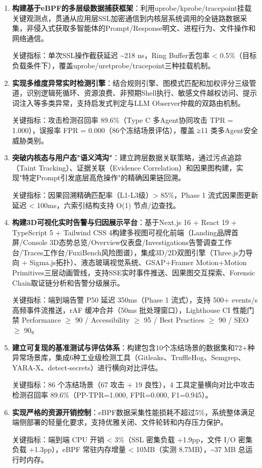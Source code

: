 \documentclass[a4paper]{ctexart}
\makeatletter
\renewcommand{\_}{%
  \ifmmode
    \nfss@text{\textunderscore}%
  \else
    \textunderscore\discretionary{}{}{}%
  \fi}
\makeatother
\begin{document}
\begin{enumerate}
\item \textbf{构建基于eBPF的多层级数据捕获框架}：利用uprobe/kprobe/tracepoint挂载关键观测点，贯通从应用层SSL加密通信到内核层系统调用的全链路数据采集，非侵入式获取多智能体的Prompt/Response明文、进程行为、文件操作和网络通信。

关键指标：单次SSL操作截获延迟 \textasciitilde{}218 ns，Ring Buffer丢包率 < 0.5\%（目标负载条件下），覆盖uprobe/uretprobe/tracepoint三种挂载机制。

\item \textbf{实现多维度异常实时检测引擎}：结合规则引擎、图模式匹配和加权评分三级管道，识别逻辑死循环、资源浪费、非预期Shell执行、敏感文件越权访问、提示词注入等多类异常，支持启发式判定与LLM Observer仲裁的双路由机制。

关键指标：攻击检测召回率 89.6\%（Type C 多Agent协同攻击 TPR = 1.000），误报率 FPR = 0.000（86个冻结场景评估），覆盖 ≥11 类多Agent安全威胁类别。

\item \textbf{突破内核态与用户态"语义鸿沟"}：建立跨层数据关联策略，通过污点追踪（Taint Tracking）、证据关联（Evidence Correlation）和因果图构建，实现"特定Prompt引发底层高危操作"的精确因果链回溯。

关键指标：因果回溯精确匹配率（L1-L3级）> 85\%，Phase 1 流式因果图更新延迟 < 100ms，六索引结构支持 O(1) 节点/边查找。

\item \textbf{构建3D可视化实时告警与归因展示平台}：基于Next.js 16 + React 19 + TypeScript 5 + Tailwind CSS 4构建多视图可视化前端（Landing品牌首屏/Console 3D态势总览/Overview仪表盘/Investigations告警调查工作台/Traces工作台/FuxiBench风险图谱），集成3D/2D双图引擎（Three.js力导向 + Sigma.js拓扑）、液态玻璃视觉系统、GSAP+Framer Motion+Motion Primitives三层动画管线，支持SSE实时事件推送、因果图交互探索、Forensic Chain取证链分析和告警分级展示。

关键指标：端到端告警 P50 延迟 350ms（Phase 1 流式），支持 500+ events/s 高频事件流推送，rAF 缓冲合并（50ms 批处理窗口），Lighthouse CI 性能门禁 Performance $\geq$ 90 / Accessibility $\geq$ 95 / Best Practices $\geq$ 90 / SEO $\geq$ 90。

\item \textbf{建立可复现的基准测试与评估体系}：构建包含10个冻结场景的数据集和72+种异常场景库，集成6种工业级检测工具（Gitleaks、TruffleHog、Semgrep、YARA-X、detect-secrets）进行横向对比评估。

关键指标：86 个冻结场景（67 攻击 + 19 良性），4 工具定量横向对比中攻击检测召回率 89.6\%（PP-TPR=1.000, FPR=0.000, F1=0.945）。

\item \textbf{实现严格的资源开销控制}：eBPF数据采集性能损耗不超过5\%，系统整体满足端侧部署的轻量化要求，支持优雅关闭、文件轮转和内存压力保护。

关键指标：端到端 CPU 开销 < 3\%（SSL 密集负载 +1.9pp，文件 I/O 密集负载 +1.3pp），eBPF 常驻内存增量 < 10MB（实测 8.7MB），\textasciitilde{}37 MB 总运行时内存。
\end{enumerate}
\end{document}
